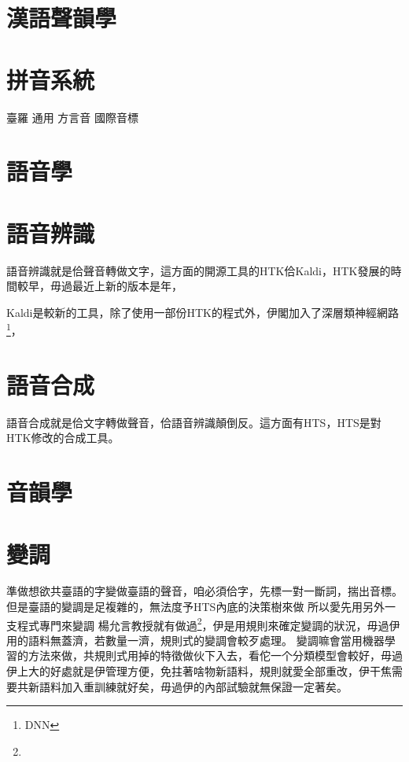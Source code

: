\documentclass[final,oneside,onecolumn,12pt,a4paper]{book}%
\begin{document}
\section{漢語聲韻學}
\label{節：漢語聲韻學}


\section{拼音系統}
\label{節：拼音系統}
	臺羅
	通用
	方言音
	國際音標
	
\section{語音學}
\label{節：語音學}

\section{語音辨識}
\label{節：語音辨識}
語音辨識就是佮聲音轉做文字，這方面的開源工具的HTK佮Kaldi，HTK發展的時間較早，毋過最近上新的版本是年，

Kaldi是較新的工具，除了使用一部份HTK的程式外，伊閣加入了深層類神經網路\footnote{DNN}，


\section{語音合成}
\label{節：語音合成}

語音合成就是佮文字轉做聲音，佮語音辨識顛倒反。這方面有HTS，HTS是對HTK修改的合成工具。


\section{音韻學}
\label{節：音韻學}
\section{變調}
\label{節：變調}

準做想欲共臺語的字變做臺語的聲音，咱必須佮字，先標一對一斷詞，揣出音標。
但是臺語的變調是足複雜的，無法度予HTS內底的決策樹來做
所以愛先用另外一支程式專門來變調
楊允言教授就有做過\footnote{}，伊是用規則來確定變調的狀況，毋過伊用的語料無蓋濟，若數量一濟，規則式的變調會較歹處理。
變調嘛會當用機器學習的方法來做，共規則式用掉的特徵做伙下入去，看佗一个分類模型會較好，毋過伊上大的好處就是伊管理方便，免拄著啥物新語料，規則就愛全部重改，伊干焦需要共新語料加入重訓練就好矣，毋過伊的內部試驗就無保證一定著矣。
\end{document}

